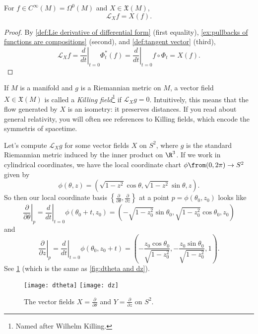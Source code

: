 \begin{lemma}\label{lem:Lie derivative of function}
	For $f \in C^\infty(M) = \Omega^0(M)$ and $X \in \mathfrak{X}(M)$, 
	\[
		\mathcal{L}_Xf = X(f).
	\]
\end{lemma}

\begin{proof}
	By \cref{def:Lie derivative of differential form} (first equality), \cref{ex:pullbacks of functions are compositions} (second), and \cref{def:tangent vector} (third), 
	\[
		\mathcal{L}_Xf = \left. \frac{d}{dt}\right|_{t=0} \Phi_t^\ast(f) = \left. \frac{d}{dt}\right|_{t=0} f \circ \Phi_t = X(f).
	\]
\end{proof}

\begin{example}
	If $M$ is a manifold and $g$ is a Riemannian metric on $M$, a vector field $X \in \mathfrak{X}(M)$ is called a \emph{Killing field}\footnote{Named after Wilhelm Killing.} if $\mathcal{L}_Xg = 0$. Intuitively, this means that the flow generated by $X$ is an isometry: it preserves distances. If you read about general relativity, you will often see references to Killing fields, which encode the symmetris of spacetime.
	
	Let's compute $\mathcal{L}_X g$ for some vector fields $X$ on $S^2$, where $g$ is the standard Riemannian metric induced by the inner product on $\R^3$. If we work in cylindrical coordinates, we have the local coordinate chart $\phi\from (0,2\pi) \to S^2$ given by
	\[
		\phi(\theta, z) = \left(\sqrt{1-z^2}\cos \theta, \sqrt{1-z^2} \sin \theta, z\right).
	\]
	So then our local coordinate basis $\left\{\frac{\partial}{\partial \theta}, \frac{\partial}{\partial z} \right\}$ at a point $p = \phi(\theta_0,z_0)$ looks like
	\[
		\left. \frac{\partial}{\partial \theta}\right|_p = \left. \frac{d}{dt} \right|_{t=0} \phi(\theta_0+t,z_0) = \left(-\sqrt{1-z_0^2}\sin\theta_0, \sqrt{1-z_0^2}\cos \theta_0,z_0\right)
	\]
	and
	\[
		\left. \frac{\partial}{\partial z}\right|_p = \left. \frac{d}{dt} \right|_{t=0} \phi(\theta_0,z_0+t) = \left(-\frac{z_0 \cos \theta_0}{\sqrt{1-z_0^2}},-\frac{z_0 \sin \theta_0}{\sqrt{1-z_0^2}},1\right).
	\]
	See \cref{fig:dtheta and dz 2} (which is the same as \cref{fig:dtheta and dz}).
	\begin{figure}[htbp]
		\centering
			\texttt{[image: dtheta]} \qquad \texttt{[image: dz]}
		\caption{The vector fields $X = \frac{\partial}{\partial \theta}$ and $Y = \frac{\partial}{\partial z}$ on $S^2$.}
		\label{fig:dtheta and dz 2}
	\end{figure}
	

\end{example}
